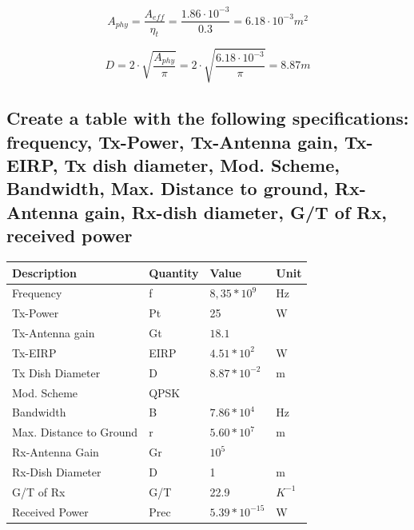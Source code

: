 \documentclass[a4paper,12pt,calibri,oneside,openany]{book}
\theoremstyle{break}
\begin{document}
		\begin{equation} \label{eq_aphy}
			A_{phy} = \dfrac{A_{eff}} {\eta_{t}} = 
			\dfrac{1.86 \cdot 10^{-3}} {0.3}=
			6.18 \cdot 10^{-3} \unit{m^{2}}
		\end{equation}
		
		\begin{equation} \label{eq_d}
			D = 2 \cdot \sqrt{\dfrac{A_{phy}}{\pi}} =
			2 \cdot \sqrt{\dfrac{6.18 \cdot 10^{-3}}{\pi}} = 8.87  \unit{m}
		\end{equation}
	
	\subsection{Create a table with the following specifications: frequency, Tx-Power, Tx-Antenna gain, Tx-EIRP, Tx dish diameter, Mod. Scheme, Bandwidth, Max. Distance to ground, Rx-Antenna gain, Rx-dish diameter, G/T of Rx, received power \\}	

		\begin{center}
			\begin{tabular}{ | l | l | l | p{1.5cm} |}
				\hline
				Description & Quantity & Value & Unit \\ \hline
				Frequency & f  & $8,35*10^{9}$ & Hz \\ \hline
				Tx-Power & Pt & 25 & W
				\\ \hline
				Tx-Antenna gain & Gt & $18.1$ & 
				\\ \hline
				Tx-EIRP & EIRP & $4.51*10^{2}$ & W
				\\ \hline
				Tx Dish Diameter & D & $8.87*10^{-2}$ & m
				\\ \hline
				Mod. Scheme & QPSK &  & 
				\\ \hline
				Bandwidth & B & $7.86*10^{4}$ & Hz
				\\ \hline
				Max. Distance to Ground & r & $5.60*10^{7}$ & m
				\\ \hline
				Rx-Antenna Gain & Gr & $10^{5}$ & 
				\\ \hline
				Rx-Dish Diameter & D & 1 & m
				\\ \hline
				G/T of Rx & G/T & 22.9 & $K^{-1}$
				\\ \hline
				Received Power & Prec & $5.39*10^{-15}$ & W
				\\ \hline
				
						\end{tabular}
					\end{center}
				
\end{document}
